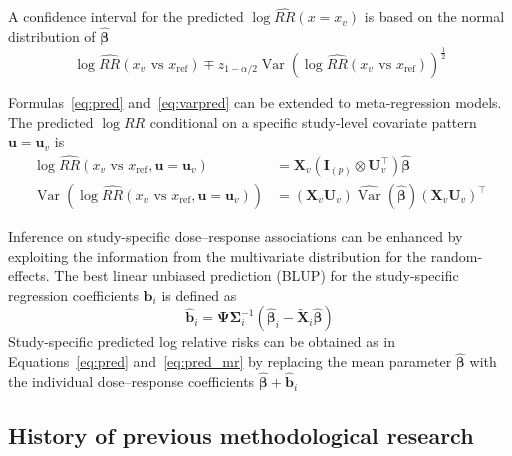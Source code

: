 \documentclass[11pt,a4paper,twoside,openany]{book}\usepackage{knitr}
\DeclareMathOperator{\Var}{Var}
\begin{document}
{{\noindent A confidence interval for the predicted $\log \widehat{RR}(x = x_v)$ is based on the normal distribution of $\boldsymbol{\hat \beta}$
\begin{equation*}
\log \widehat{RR}(x_v \text{ vs } x_\mathrm{ref}) \mp z_{1- \alpha/2} \Var \left(\log \widehat{RR}(x_v \text{ vs } x_\mathrm{ref}) \right)^{\frac{1}{2}}
\label{eq:pred_ci}
\end{equation*}

\noindent Formulas~\ref{eq:pred} and~\ref{eq:varpred} can be extended to meta-regression models. The predicted $\log RR$ conditional on a specific study-level covariate pattern $\mathbf{u} = \mathbf{u}_v$ is
\begin{align}
\log \widehat{RR}\left(x_v \text{ vs } x_\mathrm{ref}, \mathbf{u} = \mathbf{u}_v  \right) &= \mathbf{X}_v \left(\mathbf{I}_{(p)} \otimes \mathbf{U}_v^\top \right) \boldsymbol{\hat \beta}  \label{eq:pred_mr} \\
\Var \left(\log \widehat{RR}\left(x_v \text{ vs } x_\mathrm{ref}, \mathbf{u}= \mathbf{u}_v \right) \right) &= \left( \mathbf{X}_v \mathbf{U}_v\right) \widehat{\Var} \left( \boldsymbol{\hat \beta} \right) \left( \mathbf{X}_v \mathbf{U}_v\right)^\top \label{eq:varpred_mr}
\end{align}

Inference on study-specific dose--response associations can be enhanced by exploiting the information from the multivariate distribution for the random-effects. The best linear unbiased prediction (BLUP) for the study-specific regression coefficients $\mathbf{b}_i$ is defined as
\begin{equation}
\boldsymbol{\hat b}_i = \boldsymbol{\Psi} \boldsymbol{\Sigma}_i^{-1} \left(\boldsymbol{\hat \beta}_i - \widetilde{\mathbf{X}}_i \boldsymbol{\hat \beta} \right)
\label{eq:blup_ts}
\end{equation}
\noindent Study-specific predicted log relative risks can be obtained as in Equations~\ref{eq:pred} and~\ref{eq:pred_mr} by replacing the mean parameter $\boldsymbol{\hat \beta}$ with the individual dose--response coefficients $\boldsymbol{\hat \beta} + \boldsymbol{\hat b}_i$ 


\subsection{History of previous methodological research}

}}
\end{document}
